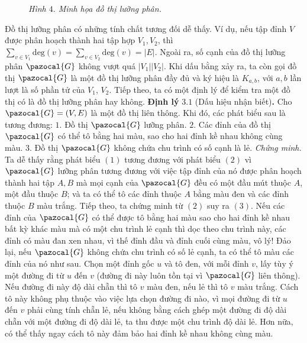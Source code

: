 \begin{multicols}{2}
\begin{figure}[H]
		\caption{\small\textit{\color{hoccungpi} Hình $4.$ Minh họa đồ thị lưỡng phân.}}
		\vspace*{-10pt}
	\end{figure}
	Đồ thị lưỡng phân có những tính chất tương đối dễ thấy. Ví dụ, nếu tập đỉnh  $V$ được phân hoạch thành hai tập hợp $V_1, V_2$, thì $
	\sum\limits_{v \in V_1} \text{deg} (v) =  \sum\limits_{v \in V_2} \text{deg} (v) = |E|.$ Ngoài ra, số cạnh của đồ thị lưỡng phân $\pazocal{G}$ không vượt quá $|V_1| |V_2|$. Khi dấu bằng xảy ra, ta còn gọi đồ thị $\pazocal{G}$ là một đồ thị lưỡng phân đầy đủ và ký hiệu là $K_{a,b}$, với $a,b$ lần lượt là số phần tử của $V_1$, $V_2$.
	Tiếp theo, ta có một định lý để kiểm tra một đồ thị có là đồ thị lưỡng phân hay không. 
	\vskip 0.1cm
	\textbf{\color{hoccungpi}Định lý} $\pmb{3.1}$ (Dấu hiệu nhận biết)\textbf{\color{hoccungpi}.} 
		Cho  $\pazocal{G} = (V,E)$ là một đồ thị liên thông. Khi đó, các phát biểu sau là tương đương:
		\vskip 0.1cm
		$1.$ Đồ thị $\pazocal{G}$ lưỡng phân.
		\vskip 0.1cm
		$2.$ Các đỉnh của đồ thị $\pazocal{G}$ có thể tô bằng hai màu, sao cho hai đỉnh kề nhau không cùng màu.
		\vskip 0.1cm
		$3.$ Đồ thị $\pazocal{G}$ không chứa chu trình có số cạnh là lẻ.
		\vskip 0.1cm
	\textit{Chứng minh.} Ta dễ thấy rằng phát biểu $(1)$ tương đương với phát biểu $(2)$ vì $\pazocal{G}$ lưỡng phân tương đương với việc tập đỉnh của nó được phân hoạch thành hai tập $A,B$ mà mọi cạnh của $\pazocal{G}$ đều có một đầu mút thuộc $A$, một đầu thuộc $B$; và ta có thể tô các đỉnh thuộc $A$ bằng màu đen và các đỉnh thuộc $B$ màu trắng.
	\vskip 0.1cm
	Tiếp theo, ta chứng minh từ $(2)$ suy ra $(3)$. Nếu các đỉnh của $\pazocal{G}$ có thể được tô bằng hai màu sao cho hai đỉnh kề nhau bất kỳ khác màu mà có một chu trình lẻ cạnh thì dọc theo chu trình này, các đỉnh có màu đan xen nhau, vì thế đỉnh đầu và đỉnh cuối cùng màu, vô lý!
	\vskip 0.1cm
	Đảo lại, nếu $\pazocal{G}$ không chứa chu trình có số lẻ cạnh, ta có thể tô màu các đỉnh của nó như sau. Chọn một đỉnh gốc $u$ và tô đen, với mỗi đỉnh $v$, lấy tùy ý một đường đi từ $u$ đến $v$ (đường đi này luôn tồn tại vì $\pazocal{G}$ liên thông). Nếu đường đi này độ dài chẵn thì tô $v$ màu đen, nếu lẻ thì tô $v$ màu trắng. Cách tô này không phụ thuộc vào việc lựa chọn đường đi nào, vì mọi đường đi từ $u$ đến $v$ phải cùng tính chẵn lẻ, nếu không  bằng cách ghép một đường đi độ dài chẵn với một đường đi độ dài lẻ, ta thu được một chu trình độ dài lẻ. Hơn nữa, có thể thấy ngay cách tô này đảm bảo hai đỉnh kề nhau không cùng màu. 

\end{multicols}
